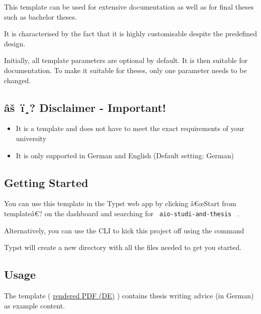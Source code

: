 This template can be used for extensive documentation as well as for
final theses such as bachelor theses.

It is characterised by the fact that it is highly customisable despite
the predefined design.

Initially, all template parameters are optional by default. It is then
suitable for documentation. To make it suitable for theses, only one
parameter needs to be changed.

\subsection{\texorpdfstring{âš~ï¸? \textbf{Disclaimer -
Important!}}{âš~ï¸? Disclaimer - Important!}}\label{uxe2ux161-uxef-disclaimer---important}

\begin{itemize}
\tightlist
\item
  It is a template and does not have to meet the exact requirements of
  your university
\item
  It is only supported in German and English (Default setting: German)
\end{itemize}

\subsection{Getting Started}\label{getting-started}

You can use this template in the Typst web app by clicking â€œStart from
templateâ€? on the dashboard and searching for
\texttt{\ aio-studi-and-thesis\ } .

Alternatively, you can use the CLI to kick this project off using the
command

\begin{Shaded}
\begin{Highlighting}[]
\end{Highlighting}
\end{Shaded}

Typst will create a new directory with all the files needed to get you
started.

\subsection{Usage}\label{usage}

The template (
\href{https://github.com/typst/packages/raw/main/packages/preview/aio-studi-and-thesis/0.1.0/docs/example-de-thesis.pdf}{rendered
PDF (DE)} ) contains thesis writing advice (in German) as example
content.

